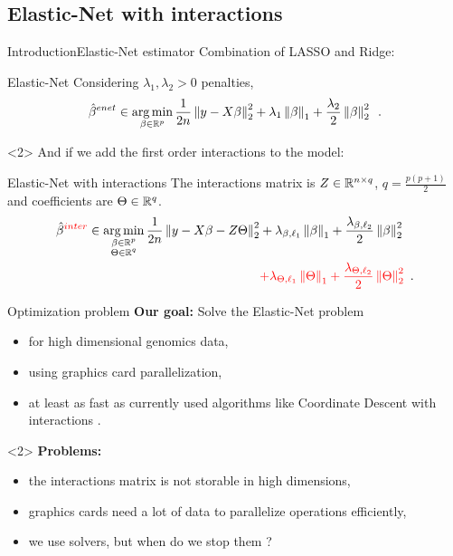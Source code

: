 \documentclass[10pt,aspectratio=43]{beamer}
\begin{document}
\subsection{Elastic-Net with interactions}
\begin{frame}{Introduction}{Elastic-Net estimator \citep{Zou_Hastie05}}
Combination of LASSO \citep{Tibshirani96} and
Ridge\citep{Tikhonov43}:
\begin{block}{Elastic-Net}
Considering $\lambda_1,\lambda_2>0$ penalties,
\begin{align*}
    \hat\beta^{enet} \in \mathop{\mathrm{arg\,min}}_{\beta \in \mathbb{R}^p}\frac{1}{2n}\left \lVert y - X\beta \right \rVert_2^2
    + \lambda_1 \left \lVert \beta \right \rVert_1
    + \frac{\lambda_2}{2} \left \lVert \beta \right \rVert_2^2 \enspace.
\end{align*}
\end{block}
\begin{onlyenv}<2>
    And if we add the first order interactions to the model:
    \begin{block}{Elastic-Net with interactions}
    The interactions matrix is $Z\in\mathbb{R}^{n\times q}$, $q=\tfrac{p(p+1)}{2}$
     and coefficients are $\Theta\in\mathbb{R}^q$.
        \begin{align*}
        \hat\beta^{\textcolor{red}{inter}}
        \in \mathop{\mathrm{arg\,min}}_{\substack{\beta \in \mathbb{R}^p \\ \Theta \in \mathbb{R}^q}}
        \frac{1}{2n}\left \lVert y - X\beta - Z\Theta \right \rVert_2^2
        & + \lambda_{\beta,\ell_1} \left \lVert \beta \right \rVert_1
        + \frac{\lambda_{\beta, \ell_2}}{2} \left \lVert \beta \right \rVert_2^2 \\
        & \textcolor{red}{+ \lambda_{\Theta,\ell_1} \left \lVert \Theta \right \rVert_1
        + \frac{\lambda_{\Theta, \ell_2}}{2} \left \lVert \Theta \right \rVert_2^2}
        \enspace.
    \end{align*}
\end{block}
\end{onlyenv}
\end{frame}

\begin{frame}{Optimization problem}
\textbf{Our goal:} Solve the Elastic-Net problem
\begin{itemize}
    \item for high dimensional genomics data,
    \item using graphics card parallelization,
    \item at least as fast as currently used algorithms like Coordinate Descent
    with interactions \citep{Bascou_Lebre_Salmon20}.
\end{itemize}

\begin{onlyenv}<2>
\textbf{Problems:}
    \begin{itemize}
        \item the interactions matrix is not storable in high dimensions,
        \item graphics cards need a lot of data to parallelize operations
        efficiently,
        \item we use solvers, but when do we stop them ?
    \end{itemize}
\end{onlyenv}
\end{frame}
\end{document}
